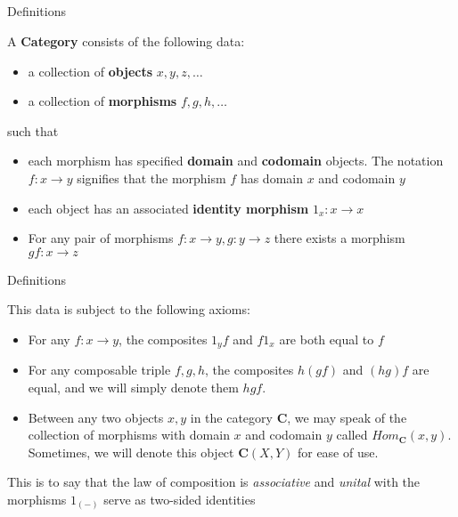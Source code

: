 \documentclass[tikz]{beamer}
\theoremstyle{definition}
\begin{document}
\subsection{}
\begin{frame}{Definitions}
\begin{definition}[Category]
A \textbf{Category} consists of the following data:
\begin{itemize}
    \item a collection of \textbf{objects} $x, y, z, \ldots$
    \item a collection of \textbf{morphisms} $f, g, h, \ldots$
\end{itemize}
 such that
\begin{itemize}
    \item each morphism has specified \textbf{domain} and \textbf{codomain} objects. The notation $f: x \to y$ signifies that the morphism $f$ has domain $x$ and codomain $y$
    \item each object has an associated \textbf{identity morphism} $1_x : x \to x$
    \item For any pair of morphisms $f: x \to y, g: y \to z$ there exists a morphism $gf: x \to z$
\end{itemize}

\end{definition}
\end{frame}
\begin{frame}{Definitions}

This data is subject to the following axioms:

\begin{itemize}
    \item For any $f: x \to y$, the composites $1_y f$ and  $f 1_x$ are both equal to $f$
    \item For any composable triple $f, g, h$, the composites $h(gf)$ and $(hg)f$ are equal, and we will simply denote them $hgf$.
    \item Between any two objects $x, y$ in the category $\mathbf{C}$, we may speak of the collection of morphisms with domain $x$ and codomain $y$ called $Hom_{\mathbf{C}}(x, y)$. Sometimes, we will denote this object $\mathbf{C}(X, Y)$ for ease of use.
\end{itemize}

This is to say that the law of composition is \textit{associative} and \textit{unital} with the morphisms $1_{(-)}$  serve as two-sided identities
\end{frame}
\end{document}
